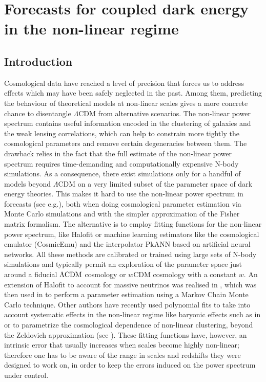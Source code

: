 \chapter{Forecasts for coupled dark energy in the non-linear regime \label{chap:Fitting-CDE}}


\section{Introduction}





Cosmological data have reached a level of precision that forces us
to address effects which may have been safely neglected in the past.
Among them, predicting the behaviour of theoretical models at non-linear
scales gives a more concrete chance to disentangle $\Lambda$CDM from
alternative scenarios. The non-linear power spectrum contains useful
information encoded in the clustering of galaxies and the weak lensing
correlations, which can help to constrain more tightly the cosmological
parameters and remove certain degeneracies between them. The drawback
relies in the fact that the full estimate of the non-linear power
spectrum requires time-demanding and computationally expensive N-body
simulations. As a consequence, there exist simulations only for a
handful of models beyond $\Lambda$CDM on a very limited subset of
the parameter space of dark energy theories. This makes it hard to
use the non-linear power spectrum in forecasts (see e.g.),
both when doing cosmological parameter estimation via Monte Carlo
simulations and with the simpler approximation of the Fisher matrix
formalism. The alternative is to employ fitting functions for the
non-linear power spectrum, like Halofit \citep{smith_stable_2003,takahashi_revising_2012}
or machine learning estimators like the cosmological emulator (CosmicEmu)
\citep{heitmann_coyote_2010,lawrence_coyote_2010,heitmann_coyote_2014}
and the interpolator PkANN \cite{agarwal_pkann_2012,agarwal_pkann_2014}
based on artificial neural networks. All these methods are calibrated
or trained using large sets of N-body simulations and typically permit
an exploration of the parameter space just around a fiducial $\Lambda\mathrm{CDM}$
cosmology or $w\mbox{CDM }$cosmology with a constant $w$. An extension
of Halofit to account for massive neutrinos was realised in \citep{bird_massive_2011},
which was then used in \citep{audren_neutrino_2013} to perform a
parameter estimation using a Markov Chain Monte Carlo technique. Other
authors have recently used polynomial fits to take into account systematic
effects in the non-linear regime like baryonic effects such as in
\cite{bielefeld_cosmological_2014} or to parametrize the cosmological
dependence of non-linear clustering, beyond the Zeldovich approximation
(see \cite{mohammed_analytic_2014}). These fitting functions have,
however, an intrinsic error that usually increases when scales become
highly non-linear; therefore one has to be aware of the range in scales
and redshifts they were designed to work on, in order to keep the
errors induced on the power spectrum under control.

